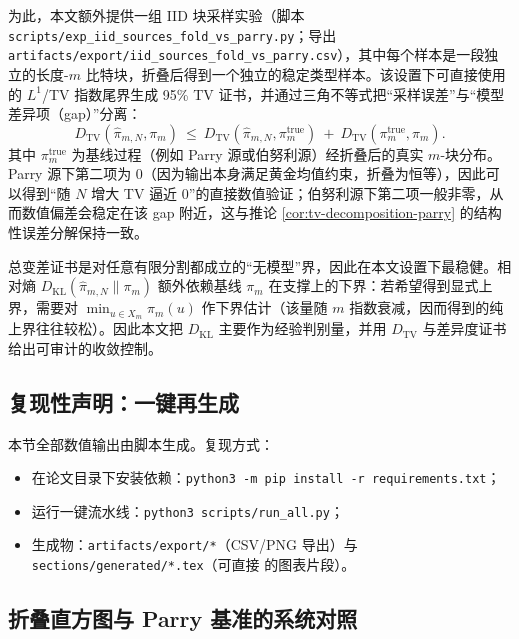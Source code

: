 为此，本文额外提供一组 IID 块采样实验（脚本 \texttt{scripts/exp\_iid\_sources\_fold\_vs\_parry.py}；导出 \texttt{artifacts/export/iid\_sources\_fold\_vs\_parry.csv}），其中每个样本是一段独立的长度-$m$ 比特块，折叠后得到一个独立的稳定类型样本。该设置下可直接使用 \cite{WeissmanEtAl2003L1Empirical} 的 $L^1$/TV 指数尾界生成 95\% TV 证书，并通过三角不等式把“采样误差”与“模型差异项（gap）”分离：
\[
D_{\mathrm{TV}}(\hat{\pi}_{m,N},\pi_m)\ \le\ D_{\mathrm{TV}}(\hat{\pi}_{m,N},\pi_m^{\mathrm{true}})\ +\ D_{\mathrm{TV}}(\pi_m^{\mathrm{true}},\pi_m).
\]
其中 $\pi_m^{\mathrm{true}}$ 为基线过程（例如 Parry 源或伯努利源）经折叠后的真实 $m$-块分布。Parry 源下第二项为 $0$（因为输出本身满足黄金均值约束，折叠为恒等），因此可以得到“随 $N$ 增大 TV 逼近 0”的直接数值验证；伯努利源下第二项一般非零，从而数值偏差会稳定在该 gap 附近，这与推论 \ref{cor:tv-decomposition-parry} 的结构性误差分解保持一致。




\begin{remark}
总变差证书是对任意有限分割都成立的“无模型”界，因此在本文设置下最稳健。相对熵 $D_{\mathrm{KL}}(\hat{\pi}_{m,N}\|\pi_m)$ 额外依赖基线 $\pi_m$ 在支撑上的下界：若希望得到显式上界，需要对 $\min_{u\in X_m}\pi_m(u)$ 作下界估计（该量随 $m$ 指数衰减，因而得到的纯上界往往较松）。因此本文把 $D_{\mathrm{KL}}$ 主要作为经验判别量，并用 $D_{\mathrm{TV}}$ 与差异度证书给出可审计的收敛控制。
\end{remark}

\subsection{复现性声明：一键再生成}

本节全部数值输出由脚本生成。复现方式：
\begin{itemize}
  \item 在论文目录下安装依赖：\verb|python3 -m pip install -r requirements.txt|；
  \item 运行一键流水线：\verb|python3 scripts/run_all.py|；
  \item 生成物：\verb|artifacts/export/*|（CSV/PNG 导出）与 \verb|sections/generated/*.tex|（可直接 \verb|| 的图表片段）。
\end{itemize}

\subsection{折叠直方图与 Parry 基准的系统对照}

